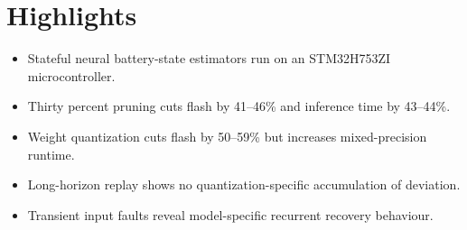 \documentclass[12pt]{article}
\begin{document}
\section*{Highlights}

\begin{itemize}
    \item Stateful neural battery-state estimators run on an STM32H753ZI microcontroller.
    \item Thirty percent pruning cuts flash by 41--46\% and inference time by 43--44\%.
    \item Weight quantization cuts flash by 50--59\% but increases mixed-precision runtime.
    \item Long-horizon replay shows no quantization-specific accumulation of deviation.
    \item Transient input faults reveal model-specific recurrent recovery behaviour.
\end{itemize}
\end{document}
